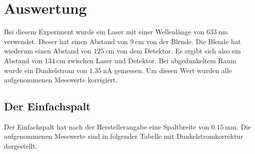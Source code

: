 \section{Auswertung}
\label{sec:Auswertung}
Bei diesem Experiment wurde ein Laser mit einer Wellenlänge von $\SI{633}{\nano\meter}$
verwendet. Dieser hat einen Abstand von $\SI{9}{\centi\meter}$ von der Blende.
Die Blende hat wiederum einen Abstand von $\SI{125}{\centi\meter}$ von dem Detektor.
Es ergibt sich also ein Abstand von $\SI{134}{\centi\meter}$ zwischen Laser und Detektor.
Bei abgedunkeltem Raum wurde ein Dunkelstrom von $\SI{1.35}{\nano\ampere}$ gemessen.
Um diesen Wert wurden alle aufgenommenen Messwerte korrigiert.

\subsection{Der Einfachspalt}
Der Einfachspalt hat nach der Herstellerangabe eine Spaltbreite von $\SI{0.15}{\milli\meter}$.
Die aufgenommenen Messwerte sind in folgender Tabelle mit Dunkelstromkorrektur
dargestellt.

